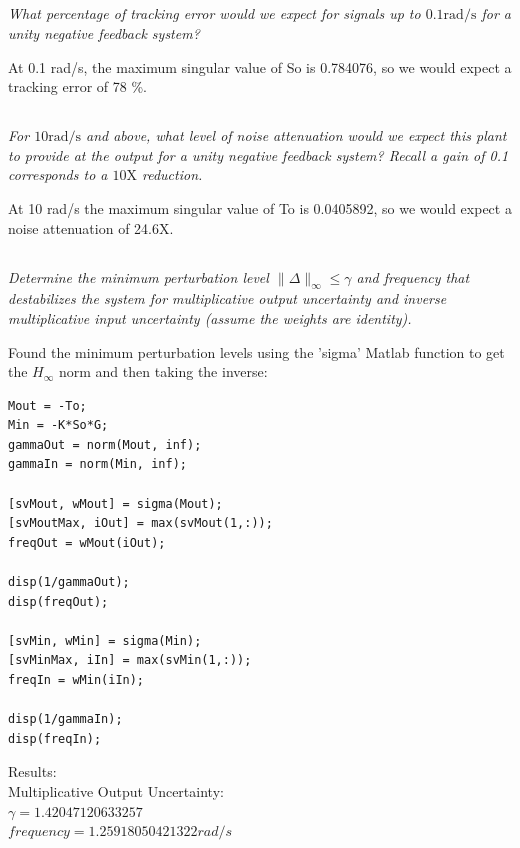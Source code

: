 \documentclass{article}
\begin{document}
\subsection{}
\textit{What percentage of tracking error would we expect for signals up to $0.1 \mathrm{rad/s}$ for a unity negative feedback system?}

At 0.1 rad/s, the maximum singular value of So is 0.784076, so we would expect a tracking error of 78 \%.

\subsection{}
\textit{For $10 \mathrm{rad/s}$ and above, what level of noise attenuation would we expect this plant to provide at the output for a unity negative feedback system? Recall a gain of 0.1 corresponds to a $10 \mathrm{X}$ reduction.}

At 10 rad/s the maximum singular value of To is 0.0405892, so we would expect a noise attenuation of 24.6X.

\subsection{}
\textit{Determine the minimum perturbation level $\|\Delta\|_{\infty} \leq \gamma$ and frequency that destabilizes the system for multiplicative output uncertainty and inverse multiplicative input uncertainty (assume the weights are identity).}

Found the minimum perturbation levels using the 'sigma' Matlab function to get the $H_\infty$ norm and then taking the inverse:

\begin{lstlisting}[style=matlabstyle]
Mout = -To;
Min = -K*So*G;
gammaOut = norm(Mout, inf);
gammaIn = norm(Min, inf);

[svMout, wMout] = sigma(Mout);
[svMoutMax, iOut] = max(svMout(1,:));
freqOut = wMout(iOut);

disp(1/gammaOut);
disp(freqOut);

[svMin, wMin] = sigma(Min);
[svMinMax, iIn] = max(svMin(1,:));
freqIn = wMin(iIn);

disp(1/gammaIn);
disp(freqIn);
\end{lstlisting}

Results: \\
Multiplicative Output Uncertainty: \\
$\gamma = 1.42047120633257$ \\
$frequency = 1.25918050421322 rad/s$ \\
\end{document}
